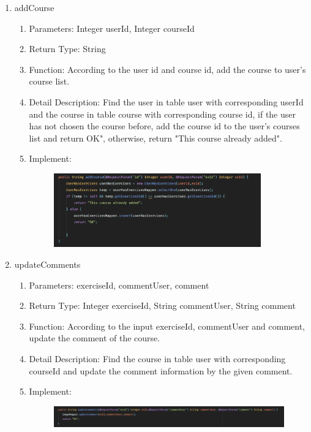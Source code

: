 \documentclass[16pt]{scrreprt}
\begin{document}
\begin{enumerate}
\begin{enumerate}
\begin{figure}[H]
\end{figure}
\end{enumerate}
    \item addCourse
    \begin{enumerate}
        \item Parameters: Integer userId, Integer courseId
        \item Return Type: String
        \item Function: According to the user id and course id, add the course to user's course list.
        \item Detail Description: Find the user in table user with corresponding userId and the course in table course with corresponding course id, if the user has not chosen the course before, add the course id to the user's courses list and return OK", otherwise, return "This course already added".
        \item Implement:
        \begin{figure}[H]
    \centering
    \includegraphics[width=0.9\textwidth]{diagrams/userAddCourse.png}\\
\end{figure}
\end{enumerate}
    \item updateComments
    \begin{enumerate}
        \item Parameters: exerciseId, commentUser, comment
        \item Return Type: Integer exerciseId, String commentUser, String comment
        \item Function: According to the input exerciseId, commentUser and comment, update the comment of the course.
        \item Detail Description: Find the course in table user with corresponding courseId and update the comment information by the given comment.
        \item Implement:
        \begin{figure}[H]
    \centering
    \includegraphics[width=1.\textwidth]{diagrams/updateComments.png}\\
\end{figure}
    \end{enumerate}
\end{enumerate}
\end{document}
